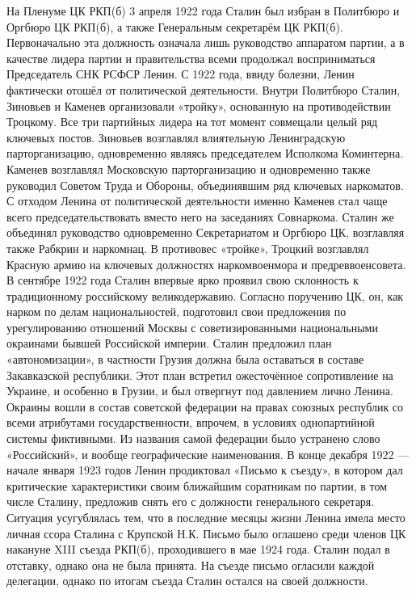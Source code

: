 На Пленуме ЦК РКП(б) 3 апреля 1922 года Сталин был избран в Политбюро и Оргбюро ЦК РКП(б), а также Генеральным секретарём ЦК РКП(б). Первоначально эта должность означала лишь руководство аппаратом партии, а в качестве лидера партии и правительства всеми продолжал восприниматься Председатель СНК РСФСР Ленин.
С 1922 года, ввиду болезни, Ленин фактически отошёл от политической деятельности. Внутри Политбюро Сталин, Зиновьев и Каменев организовали «тройку», основанную на противодействии Троцкому. Все три партийных лидера на тот момент совмещали целый ряд ключевых постов. Зиновьев возглавлял влиятельную Ленинградскую парторганизацию, одновременно являясь председателем Исполкома Коминтерна. Каменев возглавлял Московскую парторганизацию и одновременно также руководил Советом Труда и Обороны, объединявшим ряд ключевых наркоматов. С отходом Ленина от политической деятельности именно Каменев стал чаще всего председательствовать вместо него на заседаниях Совнаркома. Сталин же объединял руководство одновременно Секретариатом и Оргбюро ЦК, возглавляя также Рабкрин и наркомнац.
В противовес «тройке», Троцкий возглавлял Красную армию на ключевых должностях наркомвоенмора и предреввоенсовета.
В сентябре 1922 года Сталин впервые ярко проявил свою склонность к традиционному российскому великодержавию. Согласно поручению ЦК, он, как нарком по делам национальностей, подготовил свои предложения по урегулированию отношений Москвы с советизированными национальными окраинами бывшей Российской империи. Сталин предложил план «автономизации», в частности Грузия должна была оставаться в составе Закавказской республики. Этот план встретил ожесточённое сопротивление на Украине, и особенно в Грузии, и был отвергнут под давлением лично Ленина. Окраины вошли в состав советской федерации на правах союзных республик со всеми атрибутами государственности, впрочем, в условиях однопартийной системы фиктивными. Из названия самой федерации было устранено слово «Российский», и вообще географические наименования.
В конце декабря 1922 — начале января 1923 годов Ленин продиктовал «Письмо к съезду», в котором дал критические характеристики своим ближайшим соратникам по партии, в том числе Сталину, предложив снять его с должности генерального секретаря. Ситуация усугублялась тем, что в последние месяцы жизни Ленина имела место личная ссора Сталина с Крупской Н.К.
Письмо было оглашено среди членов ЦК накануне XIII съезда РКП(б), проходившего в мае 1924 года. Сталин подал в отставку, однако она не была принята. На съезде письмо огласили каждой делегации, однако по итогам съезда Сталин остался на своей должности.

